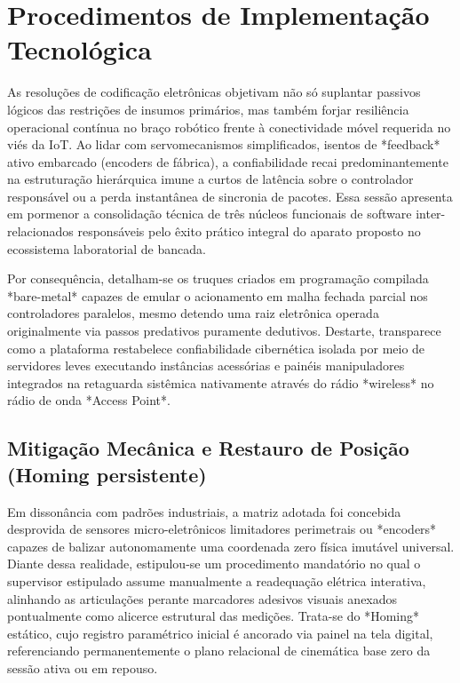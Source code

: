 \section{Procedimentos de Implementação Tecnológica}

As resoluções de codificação eletrônicas objetivam não só suplantar passivos lógicos das restrições de insumos primários, mas também forjar resiliência operacional contínua no braço robótico frente à conectividade móvel requerida no viés da IoT. Ao lidar com servomecanismos simplificados, isentos de *feedback* ativo embarcado (encoders de fábrica), a confiabilidade recai predominantemente na estruturação hierárquica imune a curtos de latência sobre o controlador responsável ou a perda instantânea de sincronia de pacotes. Essa sessão apresenta em pormenor a consolidação técnica de três núcleos funcionais de software inter-relacionados responsáveis pelo êxito prático integral do aparato proposto no ecossistema laboratorial de bancada.

Por consequência, detalham-se os truques criados em programação compilada *bare-metal* capazes de emular o acionamento em malha fechada parcial nos controladores paralelos, mesmo detendo uma raiz eletrônica operada originalmente via passos predativos puramente dedutivos. Destarte, transparece como a plataforma restabelece confiabilidade cibernética isolada por meio de servidores leves executando instâncias acessórias e painéis manipuladores integrados na retaguarda sistêmica nativamente através do rádio *wireless* no rádio de onda *Access Point*.

\subsection{Mitigação Mecânica e Restauro de Posição (Homing persistente)}

Em dissonância com padrões industriais, a matriz adotada foi concebida desprovida de sensores micro-eletrônicos limitadores perimetrais ou *encoders* capazes de balizar autonomamente uma coordenada zero física imutável universal. Diante dessa realidade, estipulou-se um procedimento mandatório no qual o supervisor estipulado assume manualmente a readequação elétrica interativa, alinhando as articulações perante marcadores adesivos visuais anexados pontualmente como alicerce estrutural das medições. Trata-se do *Homing* estático, cujo registro paramétrico inicial é ancorado via painel na tela digital, referenciando permanentemente o plano relacional de cinemática base zero da sessão ativa ou em repouso.

